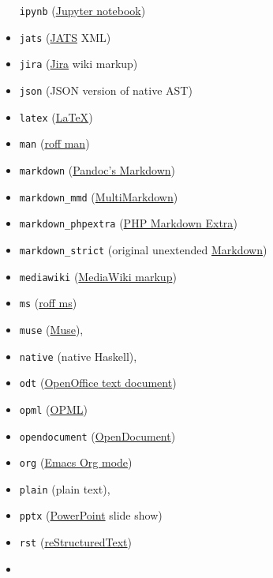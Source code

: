 \documentclass[
  12pt,
  a4paper,
]{article}
\begin{document}
\begin{description}
\begin{itemize}
  \texttt{ipynb} (\href{https://nbformat.readthedocs.io/en/latest/}{Jupyter notebook})
\item
  \texttt{jats} (\href{https://jats.nlm.nih.gov}{JATS} XML)
\item
  \texttt{jira}
  (\href{https://jira.atlassian.com/secure/WikiRendererHelpAction.jspa?section=all}{Jira} wiki
  markup)
\item
  \texttt{json} (JSON version of native AST)
\item
  \texttt{latex} (\href{http://latex-project.org}{LaTeX})
\item
  \texttt{man} (\href{http://man7.org/linux/man-pages/man7/groff_man.7.html}{roff man})
\item
  \texttt{markdown} (\protect\hyperlink{pandocs-markdown}{Pandoc's Markdown})
\item
  \texttt{markdown\_mmd} (\href{http://fletcherpenney.net/multimarkdown/}{MultiMarkdown})
\item
  \texttt{markdown\_phpextra} (\href{https://michelf.ca/projects/php-markdown/extra/}{PHP Markdown
  Extra})
\item
  \texttt{markdown\_strict} (original unextended
  \href{http://daringfireball.net/projects/markdown/}{Markdown})
\item
  \texttt{mediawiki} (\href{https://www.mediawiki.org/wiki/Help:Formatting}{MediaWiki markup})
\item
  \texttt{ms} (\href{http://man7.org/linux/man-pages/man7/groff_ms.7.html}{roff ms})
\item
  \texttt{muse} (\href{https://amusewiki.org/library/manual}{Muse}),
\item
  \texttt{native} (native Haskell),
\item
  \texttt{odt} (\href{http://en.wikipedia.org/wiki/OpenDocument}{OpenOffice text document})
\item
  \texttt{opml} (\href{http://dev.opml.org/spec2.html}{OPML})
\item
  \texttt{opendocument} (\href{http://opendocument.xml.org}{OpenDocument})
\item
  \texttt{org} (\href{http://orgmode.org}{Emacs Org mode})
\item
  \texttt{plain} (plain text),
\item
  \texttt{pptx} (\href{https://en.wikipedia.org/wiki/Microsoft_PowerPoint}{PowerPoint} slide show)
\item
  \texttt{rst}
  (\href{http://docutils.sourceforge.net/docs/ref/rst/introduction.html}{reStructuredText})
\item

\end{itemize}
\end{description}
\end{document}
